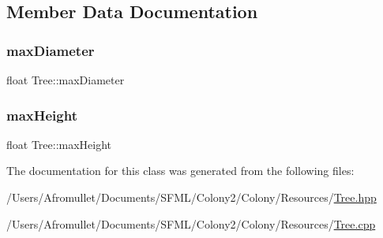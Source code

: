 \subsection{Member Data Documentation}
\mbox{\label{class_tree_a078ecd006ec479cde84bf9e4f96219a8}} 
\subsubsection{\texorpdfstring{max\+Diameter}{maxDiameter}}
{\footnotesize\ttfamily float Tree\+::max\+Diameter\hspace{0.3cm}{\ttfamily [private]}}

\mbox{\label{class_tree_a5bcc9823dd464d77520fbafdc1c8eb44}} 
\subsubsection{\texorpdfstring{max\+Height}{maxHeight}}
{\footnotesize\ttfamily float Tree\+::max\+Height\hspace{0.3cm}{\ttfamily [private]}}



The documentation for this class was generated from the following files\+:\begin{DoxyCompactItemize}
\item 
/\+Users/\+Afromullet/\+Documents/\+S\+F\+M\+L/\+Colony2/\+Colony/\+Resources/\mbox{\hyperlink{_tree_8hpp}{Tree.\+hpp}}\item 
/\+Users/\+Afromullet/\+Documents/\+S\+F\+M\+L/\+Colony2/\+Colony/\+Resources/\mbox{\hyperlink{_tree_8cpp}{Tree.\+cpp}}\end{DoxyCompactItemize}
